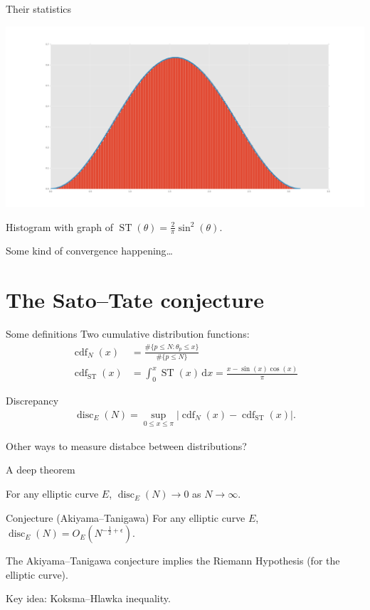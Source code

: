 \documentclass{beamer}
\DeclareMathOperator{\cdf}{cdf}
\DeclareMathOperator{\disc}{disc}
\DeclareMathOperator{\ST}{ST}
\newcommand{\dd}{\mathrm{d}}
\begin{document}
\begin{frame}{Their statistics}
\begin{center}
\includegraphics[width=\textwidth]{hist_with_density}

Histogram with graph of $\ST(\theta)=\frac{2}{\pi}\sin^2(\theta)$.
\end{center}

\pause
Some kind of convergence happening\ldots
\end{frame}

\section{The Sato--Tate conjecture}

\begin{frame}{Some definitions}
Two cumulative distribution functions:
\begin{align*}
	\cdf_N(x) &= \frac{\# \{p\leqslant N : \theta_p \leqslant x\}}{\#\{p\leqslant N\}} \\ 
	\cdf_{\ST}(x) &= \int_0^x \ST(x)\, \dd x = \frac{x-\sin(x)\cos(x)}{\pi} 
\end{align*}
\pause

Discrepancy
\begin{align*}
	\disc_E(N) = \sup_{0\leqslant x \leqslant \pi} |\cdf_N(x)-\cdf_{\ST}(x)| .
\end{align*}
\pause

Other ways to measure distabce between distributions?
\end{frame}


\begin{frame}{A deep theorem}
\begin{theorem}
For any elliptic curve $E$, $\disc_E(N) \to 0$ as $N\to \infty$. 
\end{theorem}
\pause

\begin{block}{Conjecture (Akiyama--Tanigawa)}
For any elliptic curve $E$, $\disc_E(N) = O_E(N^{-\frac 1 2+\epsilon})$.
\end{block}
\pause

\begin{theorem}
The Akiyama--Tanigawa conjecture implies the Riemann Hypothesis (for the 
elliptic curve). 
\end{theorem}
\pause

Key idea: Koksma--Hlawka inequality.
\end{frame}
\end{document}

